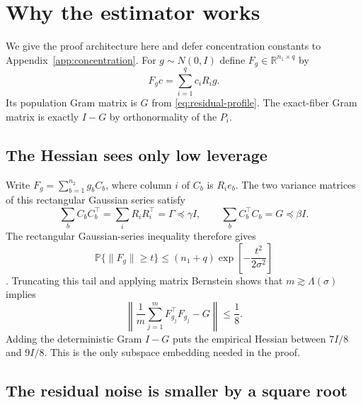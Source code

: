 \documentclass{article}
\theoremstyle{remark}
\newcommand{\Prb}{\mathbb P}
\newcommand{\1}{\mathbf 1}
\begin{document}
\section{Why the estimator works}
\label{sec:proof}

We give the proof architecture here and defer concentration constants to Appendix~\ref{app:concentration}.  For $g\sim N(0,I)$ define $F_g\in\mathbb R^{n_1\times q}$ by \[ F_gc=\sum_{i=1}^qc_iR_ig. \] Its population Gram matrix is $G$ from \eqref{eq:residual-profile}.  The exact-fiber Gram matrix is exactly $I-G$ by orthonormality of the $P_i$.

\subsection{The Hessian sees only low leverage}

Write $F_g=\sum_{b=1}^{n_2}g_bC_b$, where column $i$ of $C_b$ is $R_ie_b$. The two variance matrices of this rectangular Gaussian series satisfy
\begin{equation}
 \sum_bC_bC_b^\top=\sum_iR_iR_i^\top=\Gamma\preceq\gamma I,
 \qquad
 \sum_bC_b^\top C_b=G\preceq\beta I.
 \label{eq:series-variance}
\end{equation}
The rectangular Gaussian-series inequality therefore gives \[ \Prb\{\|F_g\|\ge t\} \le(n_1+q)\exp\!\left[-\frac{t^2}{2\sigma^2}\right] \] \citep{tropp2015matrix}.  Truncating this tail and applying matrix Bernstein shows that $m\gtrsim\Lambda(\sigma)$ implies
\begin{equation}
 \left\|\frac1m\sum_{j=1}^mF_{g_j}^\top F_{g_j}-G\right\|\le\frac18.
 \label{eq:hessian-conc}
\end{equation}
Adding the deterministic Gram $I-G$ puts the empirical Hessian between $7I/8$ and $9I/8$.  This is the only subspace embedding needed in the proof.

\subsection{The residual noise is smaller by a square root}
\end{document}
